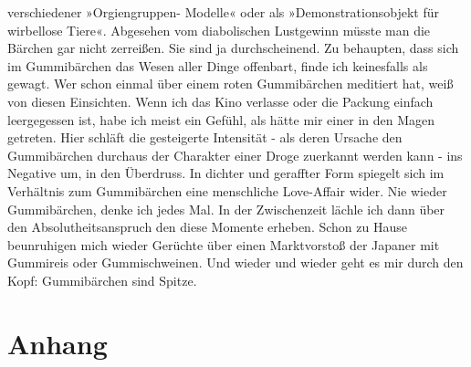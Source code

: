 \documentclass[
	ngerman,
	ruledheaders=section,%
	class=report,%
	thesis={type=bachelor},%
	accentcolor=1b,%
	custommargins=true,%
	marginpar=false,%
	parskip=half-,%
	fontsize=11pt,%
	DIV=14,
]{tudapub}
\begin{document}
verschiedener »Orgiengruppen- Modelle« oder als »Demonstrationsobjekt für wirbellose Tiere«. Abgesehen vom diabolischen Lustgewinn müsste man die Bärchen gar nicht zerreißen. Sie sind ja durchscheinend. Zu behaupten, dass sich im Gummibärchen das Wesen aller Dinge offenbart, finde ich keinesfalls als gewagt. Wer schon einmal über einem roten Gummibärchen meditiert hat, weiß von diesen Einsichten. Wenn ich das Kino verlasse oder die Packung einfach leergegessen ist, habe ich meist ein Gefühl, als hätte mir einer in den Magen getreten. Hier schläft die gesteigerte Intensität - als deren Ursache den Gummibärchen durchaus der Charakter einer Droge zuerkannt werden kann - ins Negative um, in den Überdruss. In dichter und geraffter Form spiegelt sich im Verhältnis zum Gummibärchen eine menschliche Love-Affair wider. Nie wieder Gummibärchen, denke ich jedes Mal. In der Zwischenzeit lächle ich dann über den Absolutheitsanspruch den diese Momente erheben. Schon zu Hause beunruhigen mich wieder Gerüchte über einen Marktvorstoß der Japaner mit Gummireis oder Gummischweinen. Und wieder und wieder geht es mir durch den Kopf: Gummibärchen sind Spitze.

\chapter*{Anhang}
\setcounter{page}{\value{seitenzahlroemisch}}




\printbibliography



\end{document}
